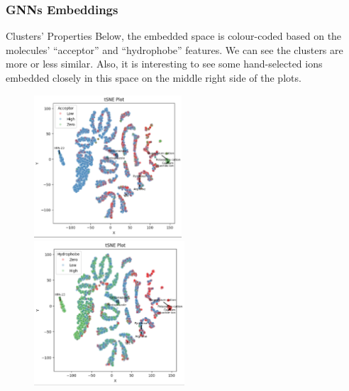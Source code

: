 \documentclass[usenames,dvipsnames]{beamer}
\begin{document}
\begin{frame}
	\frametitle{GNNs Embeddings}
	\begin{block}{Clusters' Properties}
		Below, the embedded space is colour-coded based on the molecules' ``acceptor'' and ``hydrophobe'' features. We can see the clusters are more or less similar. Also, it is interesting to see some hand-selected ions embedded closely in this space on the middle right side of the plots.
	\end{block}
	
	\begin{figure}
		\includegraphics[width=0.49\textwidth]{acceptor}
		\includegraphics[width=0.5\textwidth]{hydrophobe}		
	\end{figure}
\end{frame}

\end{document}

